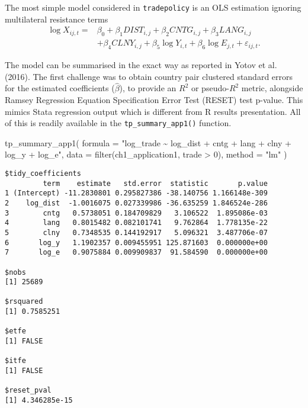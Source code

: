 \documentclass[12pt,reqno,oneside,pdftex]{formato-puc/puctesis} %
\newenvironment{Shaded}{\begin{snugshade}}{\end{snugshade}}
\newcommand{\AttributeTok}[1]{\textcolor[rgb]{0.77,0.63,0.00}{#1}}
\newcommand{\DecValTok}[1]{\textcolor[rgb]{0.00,0.00,0.81}{#1}}
\newcommand{\FunctionTok}[1]{\textcolor[rgb]{0.00,0.00,0.00}{#1}}
\newcommand{\NormalTok}[1]{#1}
\newcommand{\SpecialCharTok}[1]{\textcolor[rgb]{0.00,0.00,0.00}{#1}}
\newcommand{\StringTok}[1]{\textcolor[rgb]{0.31,0.60,0.02}{#1}}
\begin{document}
The most simple model considered in \texttt{tradepolicy} is an OLS
estimation ignoring multilateral resistance terms \begin{align*}
\log X_{ij,t} =& \beta_0 + \beta_1 DIST_{i,j} + \beta_2 CNTG_{i,j} + \beta_3 LANG_{i,j}\\ 
\text{ }& + \beta_4 CLNY_{i,j} + \beta_5 \log Y_{i,t} + \beta_6 \log E_{j,t} + \varepsilon_{ij,t}.
\end{align*}

The model can be summarised in the exact way as reported in Yotov et al.
(2016). The first challenge was to obtain country pair clustered
standard errors for the estimated coefficients (\(\hat{\beta}\)), to
provide an \(R^2\) or pseudo-\(R^2\) metric, alongside Ramsey Regression
Equation Specification Error Test (RESET) test p-value. This mimics
Stata regression output which is different from R results presentation.
All of this is readily available in the \texttt{tp\_summary\_app1()}
function.

\begin{Shaded}
\begin{Highlighting}[]
\FunctionTok{tp\_summary\_app1}\NormalTok{(}
  \AttributeTok{formula =} \StringTok{"log\_trade \textasciitilde{} log\_dist + cntg + lang + clny + log\_y + log\_e"}\NormalTok{,}
  \AttributeTok{data =} \FunctionTok{filter}\NormalTok{(ch1\_application1, trade }\SpecialCharTok{\textgreater{}} \DecValTok{0}\NormalTok{),}
  \AttributeTok{method =} \StringTok{"lm"}
\NormalTok{)}
\end{Highlighting}
\end{Shaded}

\begin{verbatim}
$tidy_coefficients
         term    estimate   std.error  statistic       p.value
1 (Intercept) -11.2830801 0.295827386 -38.140756 1.166148e-309
2    log_dist  -1.0016075 0.027339986 -36.635259 1.846524e-286
3        cntg   0.5738051 0.184709829   3.106522  1.895086e-03
4        lang   0.8015482 0.082101741   9.762864  1.778135e-22
5        clny   0.7348535 0.144192917   5.096321  3.487706e-07
6       log_y   1.1902357 0.009455951 125.871603  0.000000e+00
7       log_e   0.9075884 0.009909837  91.584590  0.000000e+00

$nobs
[1] 25689

$rsquared
[1] 0.7585251

$etfe
[1] FALSE

$itfe
[1] FALSE

$reset_pval
[1] 4.346285e-15
\end{verbatim}
\end{document}
